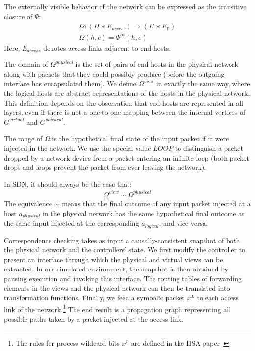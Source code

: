 The externally visible behavior of the network can be expressed as the
transitive closure of $\Psi$:
\begin{align*}
\Omega: (H \times E_{access}) \rightarrow (H \times E_{\emptyset}) \\
\Omega(h,e) = \Psi^{\infty}(h,e)
\end{align*}
Here, $E_{access}$ denotes access links adjacent to end-hosts.

The domain of $\Omega^{physical}$ is the set of pairs of end-hosts in the
physical network along with packets that they could possibly produce (before
the outgoing interface has encapsulated them). We define $\Omega^{view}$ in exactly the same way, where
the logical hosts are abstract representations of the hosts in the physical
network. This definition depends on the observation that end-hosts are represented
in all layers, even if there is not a one-to-one mapping between the
internal vertices of $G^{virtual}$ and $G^{physical}$.

The range of $\Omega$ is the hypothetical final state of the
input packet if it were injected in the network.
We use the special value $LOOP$ to distinguish
a packet dropped by a network device from a packet entering an
infinite loop (both packet drops and loops prevent the packet from ever leaving the network).

In SDN, it should always be the case that:
\begin{align*}
\Omega^{view} \sim \Omega^{physical}
\end{align*}
The equivalence $\sim$ means that the final outcome of any input packet
injected at a host $a_{physical}$ in the physical network has the same hypothetical final outcome as
the same input injected at the corresponding $a_{logical}$, and vice versa.

Correspondence checking takes as input a causally-consistent
snapshot of both the physical network and the
controllers' state. We first modify the controller to present an
interface through which the physical and virtual views can be
extracted. In our simulated environment, the snapshot is
then obtained by pausing execution and invoking this interface.
The routing tables of forwarding elements in the views and the physical
network can then be translated into transformation functions.
Finally, we feed a symbolic packet $x^L$ to each access link of the
network.\footnote{The rules for process wildcard bits $x^n$ are defined in
the HSA paper~\cite{hsa}} The end result is a propagation graph representing
all possible paths taken by a packet injected
at the access link.

